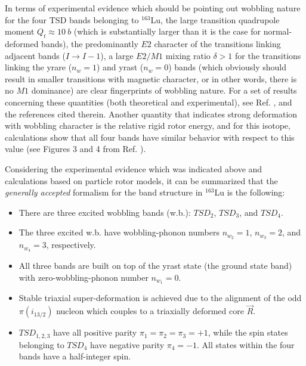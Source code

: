\documentclass[11pt]{article}
\begin{document}
In terms of experimental evidence which should be pointing out wobbling nature for the four TSD bands belonging to $^{163}$Lu, the large transition quadrupole moment $Q_t \approx 10\ b$ \cite{gorgen2004quadrupole} (which is substantially larger than it is the case for normal-deformed bands), the predominantly $E2$ character of the transitions linking adjacent bands ($I\to I-1$), a large $E2/M1$ mixing ratio $\delta>1$ for the transitions linking the yrare ($n_w=1$) and yrast ($n_w=0$) bands (which obviously should result in smaller transitions with magnetic character, or in other words, there is no $M1$ dominance) are clear fingerprints of wobbling nature. For a set of results concerning these quantities (both theoretical and experimental), see Ref. \cite{raduta2017semiclassical}, and the references cited therein. Another quantity that indicates strong deformation with wobbling character is the relative rigid rotor energy, and for this isotope, calculations show that all four bands have similar behavior with respect to this value (see Figures 3 and 4 from Ref. \cite{hagemann2005triaxiality}).

Considering the experimental evidence which was indicated above and calculations based on particle rotor models, it can be summarized that the \emph{generally accepted} formalism for the band structure in $^{163}$Lu is the following:
\begin{itemize}
    \item There are three excited wobbling bands (w.b.): $TSD_2$, $TSD_3$, and $TSD_4$.
    \item The three excited w.b. have wobbling-phonon numbers $n_{w_2}=1$, $n_{w_3}=2$, and $n_{w_4}=3$, respectively.
    \item All three bands are built on top of the yrast state (the ground state band) with zero-wobbling-phonon number $n_{w_1}=0$.
    \item Stable triaxial super-deformation is achieved due to the alignment of the odd $\pi(i_{13/2})$ nucleon which couples to a triaxially deformed core $\vec{R}$.
    \item $TSD_{1,2,3}$ have all positive parity $\pi_1=\pi_2=\pi_3=+1$, while the spin states belonging to $TSD_4$ have negative parity $\pi_4=-1$. All states within the four bands have a half-integer spin.
 \end{itemize}
\end{document}

